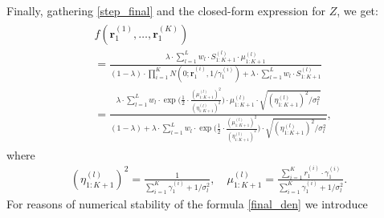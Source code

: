 Finally, gathering \eqref{step_final} and the closed-form expression for $Z$, we get:
\begin{align}
    \label{final_den}
    \begin{split}
     & f(\textbf{r}_1^{(1)}, \dots, \textbf{r}_1^{(K)}) \\
     & = \frac{ \lambda \cdot \sum_{l=1}^L w_l \cdot S_{1:K+1}^{(l)}\cdot \mu_{1:K+1}^{(l)} }{ (1-\lambda) \cdot \prod_{i=1}^K N(0; \textbf{r}_1^{(i)}, 1/\gamma_{1}^{(i)} ) + \lambda \cdot \sum_{l=1}^L w_l \cdot S_{1:K+1}^{(l)} } \\
     & = \frac{ \lambda \cdot \sum_{l=1}^L w_l \cdot  \exp \bigg (\frac{1}{2} \cdot \frac{(\mu^{(l)}_{1:K+1})^2}{(\eta^{(l)}_{1:K+1})^2}  \bigg ) \cdot \mu_{1:K+1}^{(l)} \cdot \sqrt{(\eta^{(l)}_{1:K+1})^2 / \sigma_l^2} }{ (1-\lambda) + \lambda \cdot \sum_{l=1}^L w_l \cdot \exp \bigg (\frac{1}{2} \cdot \frac{(\mu^{(l)}_{1:K+1})^2}{(\eta^{(l)}_{1:K+1})^2}  \bigg ) \cdot \sqrt{(\eta^{(l)}_{1:K+1})^2 / \sigma_l^2} },
     \end{split}
\end{align}
where
\begin{align}
    (\eta^{(l)}_{1:K+1})^2 = \frac{1}{\sum_{i=1}^K \gamma_1^{(i)}+1/\sigma_l^2}, \quad \mu^{(l)}_{1:K+1} = \frac{\sum_{i=1}^K r_1^{(i)} \cdot \gamma_1^{(i)}}{\sum_{i=1}^K \gamma_1^{(i)}+1/\sigma_l^2}.
\end{align}
For reasons of numerical stability of the formula \eqref{final_den} we introduce



